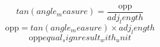 \[tan({angle_measure})=\frac{\text{{{opp}}}}{{{adj_length}}}\]
\[\text{{{opp}}}=tan({angle_measure})\times {adj_length}\]
\[\text{{{opp}}}{equal_sign}{result_with_unit}\]
